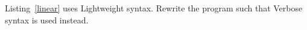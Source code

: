 Listing~\ref{linear} uses Lightweight syntax. Rewrite the program such that Verbose syntax is used instead.